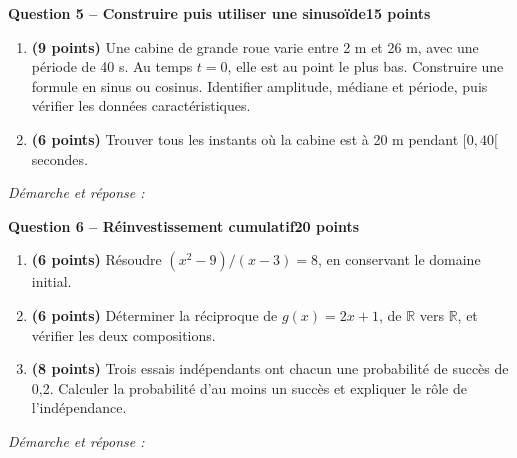 \documentclass[11pt,a4paper]{article}
\begin{document}
\newpage
{\large\bfseries Question 5 -- Construire puis utiliser une sinusoïde}\hfill\textbf{15 points}\par
\begin{enumerate}
\item \textbf{(9 points)} Une cabine de grande roue varie entre 2 m et 26 m, avec une période de 40 s. Au temps \(t=0\), elle est au point le plus bas. Construire une formule en sinus ou cosinus. Identifier amplitude, médiane et période, puis vérifier les données caractéristiques.
\item \textbf{(6 points)} Trouver tous les instants où la cabine est à 20 m pendant \([0,40[\) secondes.
\end{enumerate}
\vspace{3mm}\textit{Démarche et réponse :}\par\vfill

\newpage
{\large\bfseries Question 6 -- Réinvestissement cumulatif}\hfill\textbf{20 points}\par
\begin{enumerate}
\item \textbf{(6 points)} Résoudre \((x^2-9)/(x-3)=8\), en conservant le domaine initial.
\item \textbf{(6 points)} Déterminer la réciproque de \(g(x)=2x+1\), de \(\mathbb R\) vers \(\mathbb R\), et vérifier les deux compositions.
\item \textbf{(8 points)} Trois essais indépendants ont chacun une probabilité de succès de 0,2. Calculer la probabilité d’au moins un succès et expliquer le rôle de l’indépendance.
\end{enumerate}
\vspace{3mm}\textit{Démarche et réponse :}\par\vfill
\end{document}
